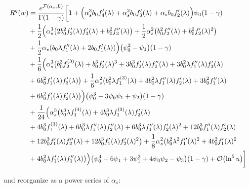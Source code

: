 \documentclass[../main.tex]{subfiles}
\begin{document}
\begin{align}
    \begin{split}
        R^q(w) &= \frac{e^{\mathcal{F}(\alpha_s,L)}}{\Gamma(1-\gamma)} \biggl[ 1 + \Bigl(\alpha_s^3 b_0 f_4'(\lambda )+\alpha_s^2 b_0 f_3'(\lambda )+\alpha_s b_0 f_2'(\lambda )\Bigr) \psi_0(1-\gamma) \\
        &+ \frac{1}{2} \Bigl(\alpha_s^3 \bigl(2 b_0^2 f_2'(\lambda ) f_3'(\lambda )+b_0^2 f_3''(\lambda )\bigr)+ \frac{1}{2} \alpha_s^2 \qty(b_0^2 f_2''(\lambda )+b_0^2 f_2'(\lambda )^2 ) \\
        &+\frac{1}{2} \alpha_s \qty(b_0 \lambda  f_1''(\lambda ) + 2 b_0 f_1'(\lambda ) )\Bigr) \qty(\psi_0^2-\psi_1)(1-\gamma) \\
        &+ \frac{1}{6}\Bigl( \alpha_s^3 \bigl(b_0^3 f_2^{(3)}(\lambda )+b_0^3 f_2'(\lambda )^3 + 3 b_0^3 f_2'(\lambda ) f_2''(\lambda )+3 b_0^2 \lambda  f_1''(\lambda ) f_3'(\lambda ) \\
        &+6 b_0^2 f_1'(\lambda ) f_3'(\lambda )\bigr) +\frac{1}{6} \alpha_s^2 \bigl(b_0^2 \lambda  f_1^{(3)}(\lambda )+3 b_0^2 \lambda  f_1''(\lambda ) f_2'(\lambda )+3 b_0^2 f_1''(\lambda )\\
        &+6 b_0^2 f_1'(\lambda ) f_2'(\lambda )\bigr) \Bigr) \qty(\psi_0^3 -3 \psi_0\psi_1+\psi_2)(1-\gamma) \\
        &+ \frac{1}{24}\Bigl(\alpha_s^3 \bigl(b_0^3 \lambda  f_1^{(4)}(\lambda )+4 b_0^3 \lambda  f_1^{(3)}(\lambda ) f_2'(\lambda )\\
        &+4 b_0^3 f_1^{(3)}(\lambda )+6 b_0^3 \lambda  f_1''(\lambda ) f_2''(\lambda )+6 b_0^3 \lambda  f_1''(\lambda ) f_2'(\lambda )^2+12 b_0^3 f_1''(\lambda ) f_2'(\lambda )\\
        &+12 b_0^3 f_1'(\lambda ) f_2''(\lambda )+12 b_0^3 f_1'(\lambda ) f_2'(\lambda )^2\bigr)+\frac{1}{8} \alpha_s^2 \bigl(b_0^2 \lambda ^2 f_1''(\lambda )^2+4 b_0^2 f_1'(\lambda )^2\\
        &+4 b_0^2 \lambda  f_1'(\lambda ) f_1''(\lambda )\bigr)\Bigr) \qty(\psi_0^4 -6 \psi_1 + 3\psi_1^3 +4\psi_0\psi_2 -\psi_3)(1-\gamma)+ \order{\ln^5 u} \biggr]
    \end{split}
\end{align}

and reorganize as a power series of $\alpha_s$:
\end{document}

